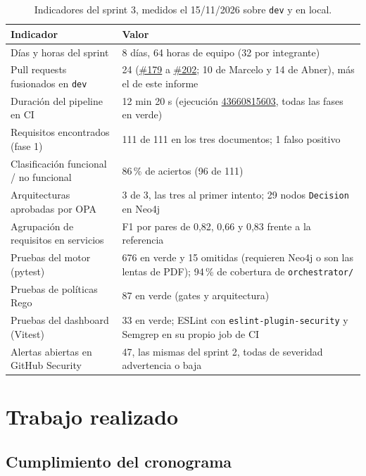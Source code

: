 \documentclass[11pt,a4paper]{report}
\newcommand{\pr}[1]{\href{https://github.com/PracticasESPE/Framework_Desarrollo_Seguro/pull/#1}{\##1}}
\newcommand{\run}[1]{\href{https://github.com/PracticasESPE/Framework_Desarrollo_Seguro/actions/runs/#1}{#1}}
\begin{document}
\begin{table}[H]
\centering
\caption{Indicadores del sprint 3, medidos el 15/11/2026 sobre \texttt{dev} y en local.}
\begin{tabularx}{\textwidth}{@{}P{6.2cm}L@{}}
\toprule
\textbf{Indicador} & \textbf{Valor}\\
\midrule
Días y horas del sprint & 8 días, 64 horas de equipo (32 por integrante)\\
Pull requests fusionados en \texttt{dev} & 24 (\pr{179} a \pr{202}; 10 de Marcelo y 14 de Abner), más el de este informe\\
Duración del pipeline en CI & 12 min 20 s (ejecución \run{43660815603}, todas las fases en verde)\\
Requisitos encontrados (fase 1) & 111 de 111 en los tres documentos; 1 falso positivo\\
Clasificación funcional / no funcional & 86\,\% de aciertos (96 de 111)\\
Arquitecturas aprobadas por OPA & 3 de 3, las tres al primer intento; 29 nodos \texttt{Decision} en Neo4j\\
Agrupación de requisitos en servicios & F1 por pares de 0,82, 0,66 y 0,83 frente a la referencia\\
Pruebas del motor (pytest) & 676 en verde y 15 omitidas (requieren Neo4j o son las lentas de PDF); 94\,\% de cobertura de \texttt{orchestrator/}\\
Pruebas de políticas Rego & 87 en verde (gates y arquitectura)\\
Pruebas del dashboard (Vitest) & 33 en verde; ESLint con \texttt{eslint-plugin-security} y Semgrep en su propio job de CI\\
Alertas abiertas en GitHub Security & 47, las mismas del sprint 2, todas de severidad advertencia o baja\\
\bottomrule
\end{tabularx}
\end{table}

\chapter{Trabajo realizado}

\section{Cumplimiento del cronograma}
\end{document}
